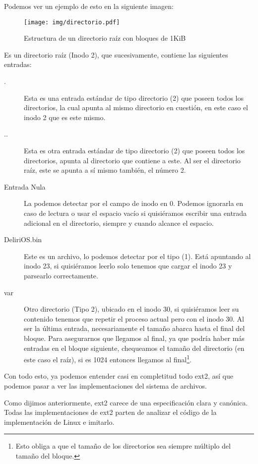 Podemos ver un ejemplo de esto en la siguiente imagen:

\begin{figure}[H]
  \centering
  \texttt{[image: img/directorio.pdf]}
  \caption{Estructura de un directorio raíz con bloques de 1KiB}
\end{figure}

Es un directorio raíz (Inodo 2), que sucesivamente, contiene las siguientes entradas:

\begin{description}
\item[.] Esta es una entrada estándar de tipo directorio (2) que poseen todos los directorios, la cual apunta al mismo directorio en cuestión, en este caso el inodo 2 que es este mismo.
\item[..] Esta es otra entrada estándar de tipo directorio (2) que poseen todos los directorios, apunta al directorio que contiene a este. Al ser el directorio raíz, este se apunta a sí mismo también, el número 2.
\item[Entrada Nula] La podemos detectar por el campo de inodo en 0. Podemos ignorarla en caso de lectura o usar el espacio vacío si quisiéramos escribir una entrada adicional en el directorio, siempre y cuando alcance el espacio.
\item[DeliriOS.bin] Este es un archivo, lo podemos detectar por el tipo (1). Está apuntando al inodo 23, si quisiéramos leerlo solo tenemos que cargar el inodo 23 y parsearlo correctamente. 
\item[var] Otro directorio (Tipo 2), ubicado en el inodo 30, si quisiéramos leer su contenido tenemos que repetir el proceso actual pero con el inodo 30. Al ser la última entrada, necesariamente el tamaño abarca hasta el final del bloque. Para asegurarnos que llegamos al final, ya que podría haber más entradas en el bloque siguiente, chequeamos el tamaño del directorio (en este caso el raíz), si es 1024 entonces llegamos al final\footnote{Esto obliga a que el tamaño de los directorios sea siempre múltiplo del tamaño del bloque.}.
\end{description}


Con todo esto, ya podemos entender casi en completitud todo ext2, así que podemos pasar a ver las implementaciones del sistema de archivos.


Como dijimos anteriormente, ext2 carece de una especificación clara y canónica.
Todas las implementaciones de ext2 parten de analizar el código de la implementación de Linux e imitarlo.

